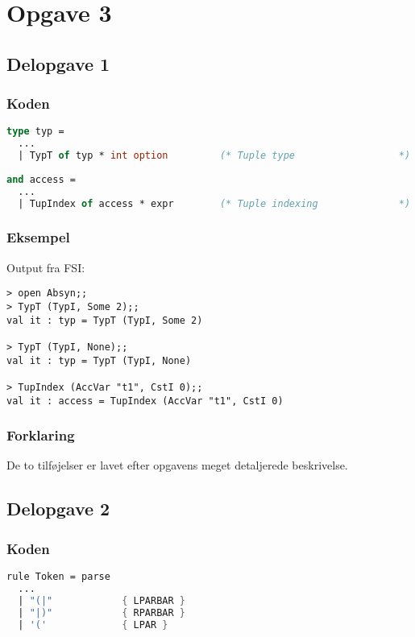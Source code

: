 \section{Opgave 3}
\subsection{Delopgave 1}\label{ass:3-1}
\subsubsection{Koden}
\begin{lstlisting}[language=fsharp]
type typ =
  ...
  | TypT of typ * int option         (* Tuple type                  *)
                                                                   
and access =                                                       
  ...
  | TupIndex of access * expr        (* Tuple indexing              *)
\end{lstlisting}

\subsubsection{Eksempel}
Output fra FSI:
\begin{lstlisting}
> open Absyn;;
> TypT (TypI, Some 2);;
val it : typ = TypT (TypI, Some 2)

> TypT (TypI, None);;
val it : typ = TypT (TypI, None)

> TupIndex (AccVar "t1", CstI 0);;
val it : access = TupIndex (AccVar "t1", CstI 0)
\end{lstlisting}

\subsubsection{Forklaring}
De to tilføjelser er lavet efter opgavens meget detaljerede beskrivelse.

\subsection{Delopgave 2}\label{ass:3-2}
\subsubsection{Koden}
\begin{lstlisting}[language=fsharp]
rule Token = parse
  ...
  | "(|"            { LPARBAR }  
  | "|)"            { RPARBAR }  
  | '('             { LPAR }
\end{lstlisting}

